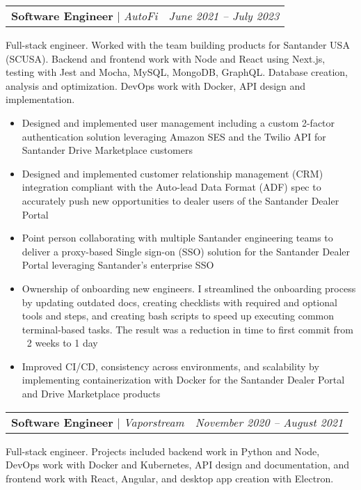 \documentclass[letterpaper,10pt]{article}
\makeatletter
\newcommand{\resumeItem}[1]{
  \item{
    {#1 \vspace{-4pt}}
  }
}
\newcommand{\titleItem}[1]{
  \textbf{#1}
}
\newcommand{\resumeProjectHeading}[2]{
    \item
    \begin{tabular*}{0.97\textwidth}{l@{\extracolsep{\fill}}r}
      #1 & \textit{ #2} \\
    \end{tabular*}\vspace{-9pt}
}
\newcommand{\resumeItemListStart}{
\begin{itemize}}
\newcommand{\resumeItemListEnd}{
\end{itemize}\vspace{-8pt}}
\makeatother
\begin{document}
    \resumeProjectHeading
           {\titleItem{{Software Engineer}} $|$ \emph{AutoFi}}{June 2021 -- July 2023}
            \begin{itemize}[leftmargin=0.15in, label={}]
                {\item{
                 {Full-stack engineer. Worked with the team building products for Santander USA (SCUSA). Backend and frontend work with Node and React using Next.js, testing with Jest and Mocha, MySQL, MongoDB, GraphQL. Database creation, analysis and optimization. DevOps work with Docker, API design and implementation.} \\
                }}
             \end{itemize}
      \resumeItemListStart
        \resumeItem{Designed and implemented user management including a custom 2-factor authentication solution leveraging Amazon SES and the Twilio API for Santander Drive Marketplace customers}
        \resumeItem{Designed and implemented customer relationship management (CRM) integration compliant with the Auto-lead Data Format (ADF) spec to accurately push new opportunities to dealer users of the Santander Dealer Portal}
        \resumeItem{Point person collaborating with multiple Santander engineering teams to deliver a proxy-based Single sign-on (SSO) solution for the Santander Dealer Portal leveraging Santander's enterprise SSO}
        \resumeItem{Ownership of onboarding new engineers. I streamlined the onboarding process by updating outdated docs, creating checklists with required and optional tools and steps, and creating bash scripts to speed up executing common terminal-based tasks. The result was a reduction in time to first commit from ~2 weeks to 1 day}
        \resumeItem{Improved CI/CD, consistency across environments, and scalability by implementing containerization with Docker for the Santander Dealer Portal and Drive Marketplace products}
        \resumeItemListEnd

    \resumeProjectHeading
           {\titleItem{{Software Engineer}} $|$ \emph{Vaporstream}}{November 2020 -- August 2021}
            \begin{itemize}[leftmargin=0.15in, label={}]
                {\item{
                 {Full-stack engineer. Projects included backend work in Python and Node, DevOps work with Docker and Kubernetes, API design and documentation, and frontend work with React, Angular, and desktop app creation with Electron.} \\
                }}
             \end{itemize}
\end{document}
